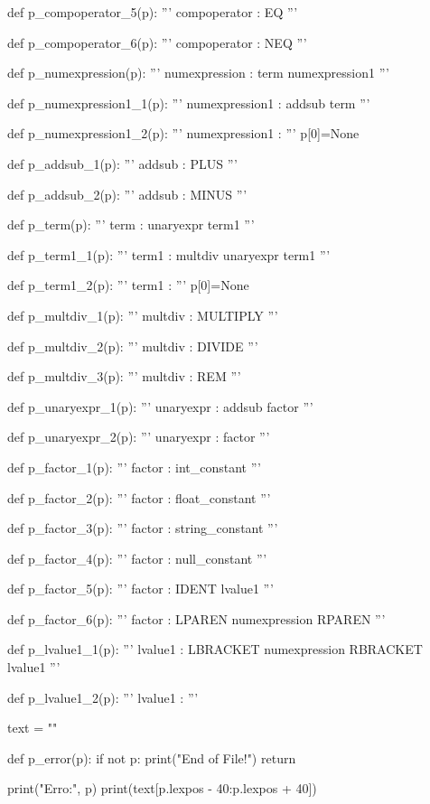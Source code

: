 \documentclass[
	12pt,				%
	openright,			%
	twoside,			%
	a4paper,			%
	english,			%
	french,				%
	spanish,			%
	brazil				%
	]{abntex2}
\begin{document}
\begin{python}
def p_compoperator_5(p):
    '''
    compoperator : EQ
    '''

def p_compoperator_6(p):
    '''
    compoperator : NEQ
    '''

def p_numexpression(p):
    '''
    numexpression : term numexpression1
    '''

def p_numexpression1_1(p):
    '''
    numexpression1 : addsub term
    '''

def p_numexpression1_2(p):
    '''
    numexpression1 : 
    '''
    p[0]=None

def p_addsub_1(p):
    '''
    addsub : PLUS
    '''

def p_addsub_2(p):
    '''
    addsub : MINUS
    '''

def p_term(p):
    '''
    term : unaryexpr term1
    '''

def p_term1_1(p):
    '''
    term1 : multdiv unaryexpr term1
    '''

def p_term1_2(p):
    '''
    term1 : 
    '''
    p[0]=None

def p_multdiv_1(p):
    '''
    multdiv : MULTIPLY
    '''

def p_multdiv_2(p):
    '''
    multdiv : DIVIDE
    '''

def p_multdiv_3(p):
    '''
    multdiv : REM
    '''

def p_unaryexpr_1(p):
    '''
    unaryexpr : addsub factor
    '''

def p_unaryexpr_2(p):
    '''
    unaryexpr : factor
    '''

def p_factor_1(p):
    '''
    factor : int_constant
    '''

def p_factor_2(p):
    '''
    factor : float_constant
    '''

def p_factor_3(p):
    '''
    factor : string_constant
    '''

def p_factor_4(p):
    '''
    factor : null_constant
    '''

def p_factor_5(p):
    '''
    factor : IDENT lvalue1
    '''

def p_factor_6(p):
    '''
    factor : LPAREN numexpression RPAREN
    '''


def p_lvalue1_1(p):
    '''
    lvalue1 : LBRACKET numexpression RBRACKET lvalue1
    '''

def p_lvalue1_2(p):
    '''
    lvalue1 : 
    '''

text = ""

def p_error(p):
    if not p:
        print("End of File!")
        return

    print("Erro:", p)
    print(text[p.lexpos - 40:p.lexpos + 40])


\end{python}
\end{document}
